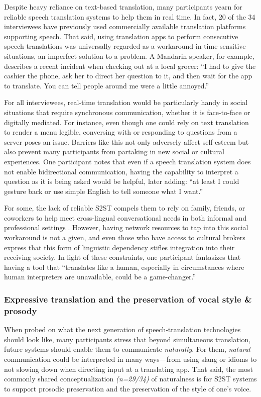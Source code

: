  Despite heavy reliance on text-based translation, many participants yearn for reliable speech translation systems to help them in real time. In fact, 20 of the 34 interviewees have previously used commercially available translation platforms supporting speech. That said, using translation apps to perform consecutive speech translations was universally regarded as a workaround in time-sensitive situations, an imperfect solution to a problem. A Mandarin speaker, for example, describes a recent incident when checking out at a local grocer: ``{I had to give the cashier the phone, ask her to direct her question to it, and then wait for the app to translate. You can tell people around me were a little annoyed.}''
 
 For all interviewees, real-time translation would be particularly handy in social situations that require synchronous communication, whether it is face-to-face or digitally mediated. For instance, even though one could rely on text translation to render a menu legible, conversing with or responding to questions from a server poses an issue. Barriers like this not only adversely affect self-esteem but also prevent many participants from partaking in new social or cultural experiences. One participant notes that even if a speech translation system does not enable bidirectional communication, having the capability to interpret a question as it is being asked would be helpful, later adding: ``{at least I could gesture back or use simple English to tell someone what I want.}''

For some, the lack of reliable S2ST compels them to rely on family, friends, or coworkers to help meet cross-lingual conversational needs in both informal and professional settings \citep{orellana2003accessing}. However, having network resources to tap into this social workaround is not a given, and even those who have access to cultural brokers \citep{sanchez2006construction} express that this form of linguistic dependency stifles integration into their receiving society. In light of these constraints, one participant fantasizes that having a tool that ``{translates like a human, especially in circumstances where human interpreters are unavailable, could be a game-changer.}''

\subsubsection{Expressive translation and the preservation of vocal style \& prosody}

When probed on what the next generation of speech-translation technologies should look like, many participants stress that beyond simultaneous translation, future systems should enable them to communicate \textit{naturally}. For them, \textit{natural} communication could be interpreted in many ways—from using slang or idioms to not slowing down when directing input at a translating app. That said, the most commonly shared conceptualization \textit{(n=29/34)} of naturalness is for S2ST systems to support prosodic preservation and the preservation of the style of one's voice. 

